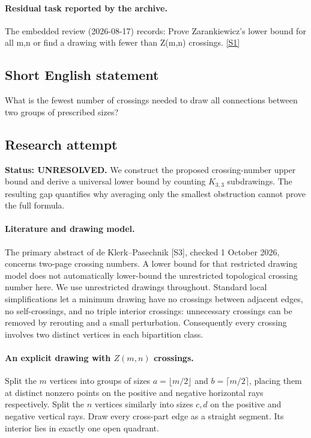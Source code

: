 \documentclass[11pt,a4paper]{article}
\newcommand{\sref}[2]{\hyperlink{source:#1:#2}{[S#2]}}
\begin{document}
\paragraph{Residual task reported by the archive.}

The embedded review (2026-08-17) records: Prove Zarankiewicz's lower bound for all m,n or find a drawing with fewer than Z(m,n) crossings. \sref{1407}{1}

\subsection{Short English statement}

What is the fewest number of crossings needed to draw all connections between two groups of prescribed sizes?

\subsection{Research attempt}
\textbf{Status: UNRESOLVED.} We construct the proposed crossing-number upper bound and derive a universal lower bound by counting $K_{3,3}$ subdrawings. The resulting gap quantifies why averaging only the smallest obstruction cannot prove the full formula.

\paragraph{Literature and drawing model.}
The primary abstract of de Klerk--Pasechnik [S3], checked 1 October 2026, concerns two-page crossing numbers. A lower bound for that restricted drawing model does not automatically lower-bound the unrestricted topological crossing number here. We use unrestricted drawings throughout. Standard local simplifications let a minimum drawing have no crossings between adjacent edges, no self-crossings, and no triple interior crossings: unnecessary crossings can be removed by rerouting and a small perturbation. Consequently every crossing involves two distinct vertices in each bipartition class.

\paragraph{An explicit drawing with $Z(m,n)$ crossings.}
Split the $m$ vertices into groups of sizes $a=\lfloor m/2\rfloor$ and $b=\lceil m/2\rceil$, placing them at distinct nonzero points on the positive and negative horizontal rays respectively. Split the $n$ vertices similarly into sizes $c,d$ on the positive and negative vertical rays. Draw every cross-part edge as a straight segment. Its interior lies in exactly one open quadrant.
\end{document}
